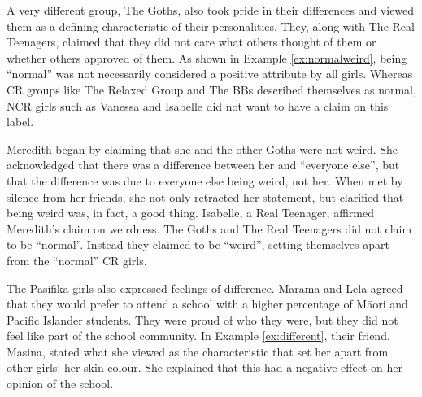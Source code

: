 A very different group, The Goths, also took pride in their differences and viewed them as a defining characteristic of their personalities. They, along with The Real Teenagers, claimed that they did not care what others thought of them or whether others approved of them. As shown in Example \ref{ex:normalweird}, being ``normal'' was not necessarily considered a positive attribute by all girls. Whereas CR groups like The Relaxed Group and The BBs described themselves as normal, NCR girls such as Vanessa and Isabelle did not want to have a claim on this label.

\label{ex:normalweird}

\vspace{5 mm}

\noindent Meredith began by claiming that she and the other Goths were not weird. She acknowledged that there was a difference between her and ``everyone else'', but that the difference was due to everyone else being weird, not her. When met by silence from her friends, she not only retracted her statement, but clarified that being weird was, in fact, a good thing. Isabelle, a Real Teenager, affirmed Meredith's claim on weirdness. The Goths and The Real Teenagers did not claim to be ``normal''. Instead they claimed to be ``weird'', setting themselves apart from the ``normal'' CR girls. 

The Pasifika girls also expressed feelings of difference. Marama and Lela agreed that they would prefer to attend a school with a higher percentage of M\=aori and Pacific Islander students. They were proud of who they were, but they did not feel like part of the school community. In Example \ref{ex:different}, their friend, Masina, stated what she viewed as the characteristic that set her apart from other girls: her skin colour. She explained that this had a negative effect on her opinion of the school.

